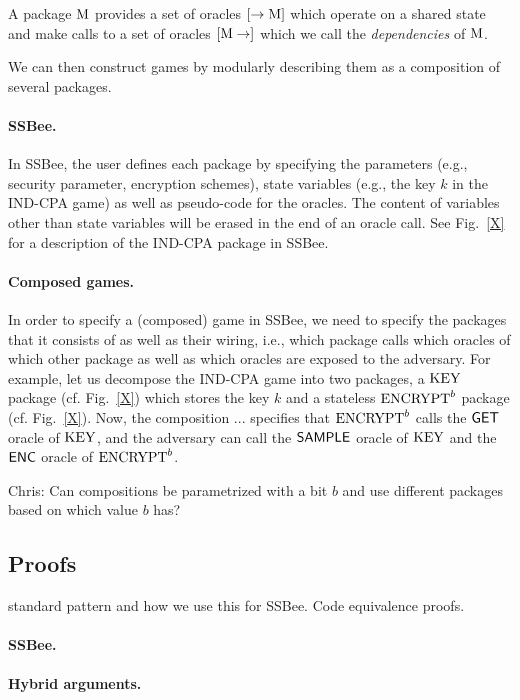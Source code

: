 \begin{definition}[Package]
A package $\text{\textrm{\upshape M}}$ provides a set of oracles $[\rightarrow \text{\textrm{\upshape M}}]$
which operate on a shared state and make calls to a set of oracles
$[\text{\textrm{\upshape M}}\rightarrow]$ which we call the \emph{dependencies} of $\text{\textrm{\upshape M}}$.
\end{definition}

We can then construct games by modularly describing them as a composition
of several packages.

\paragraph{SSBee.} In SSBee, the user defines each package by specifying
the parameters (e.g., security parameter, encryption schemes), state
variables (e.g., the key $k$ in the IND-CPA game) as well as pseudo-code
for the oracles. The content of variables other than state variables will
be erased in the end of an oracle call. See Fig.~\ref{X} for a description
of the IND-CPA package in SSBee.

\paragraph{Composed games.} In order to specify a (composed) game in SSBee, 
we need to specify the packages that it consists of as well as their wiring,
i.e., which package calls which oracles of which other package as well as
which oracles are exposed to the adversary. For example, let us
decompose the IND-CPA game into two packages, 
a $\text{\textrm{\upshape KEY}}$ package (cf. Fig.~\ref{X})
which stores the key $k$ and a stateless 
$\text{\textrm{\upshape ENCRYPT}}^b$ package (cf. Fig.~\ref{X}). Now, the composition ...
specifies that $\text{\textrm{\upshape ENCRYPT}}^b$ calls the $\mathsf{GET}$ oracle of $\text{\textrm{\upshape KEY}}$,
and the adversary can call the $\mathsf{SAMPLE}$ oracle of $\text{\textrm{\upshape KEY}}$ and the
$\mathsf{ENC}$ oracle of $\text{\textrm{\upshape ENCRYPT}}^b$.

{\color{blue}Chris: Can compositions be parametrized with a bit $b$ and
use different packages based on which value $b$ has?}

\subsection{Proofs}
standard pattern and how we use this for SSBee. Code equivalence proofs.

\paragraph{SSBee.}

\paragraph{Hybrid arguments.}
